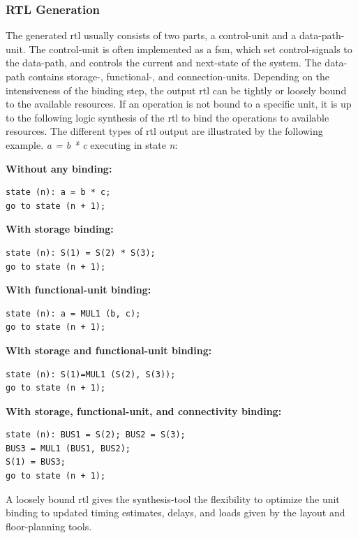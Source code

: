 \subsubsection{RTL Generation}
The generated \gls{rtl} usually consists of two parts, a control-unit and a data-path-unit. The control-unit is often implemented as a \gls{fsm}, which set control-signals to the data-path, and controls the current and next-state of the system. The data-path contains storage-, functional-, and connection-units. Depending on the intensiveness of the binding step, the output \gls{rtl} can be tightly or loosely bound to the available resources. If an operation is not bound to a specific unit, it is up to the following logic synthesis of the \gls{rtl} to bind the operations to available resources. The different types of \gls{rtl} output are illustrated by the following example. \textit{a = b * c} executing in state \textit{n}:

\begin{minipage}[t][300px]{\textwidth}
\textbf{Without any binding:}%
\begin{verbatim}
state (n): a = b * c;
go to state (n + 1);
\end{verbatim}
\textbf{With storage binding:}%
\begin{verbatim}
state (n): S(1) = S(2) * S(3);
go to state (n + 1);
\end{verbatim}
\textbf{With functional-unit binding:}%
\begin{verbatim}
state (n): a = MUL1 (b, c);
go to state (n + 1);
\end{verbatim}
\textbf{With storage and functional-unit binding:}%
\begin{verbatim}
state (n): S(1)=MUL1 (S(2), S(3));
go to state (n + 1);
\end{verbatim}
\textbf{With storage, functional-unit, and connectivity binding:}%
\begin{verbatim}
state (n): BUS1 = S(2); BUS2 = S(3);
BUS3 = MUL1 (BUS1, BUS2);
S(1) = BUS3;
go to state (n + 1);
\end{verbatim}
\end{minipage}

A loosely bound \gls{rtl} gives the synthesis-tool the flexibility to optimize the unit binding to updated timing estimates, delays, and loads given by the layout and floor-planning tools.

